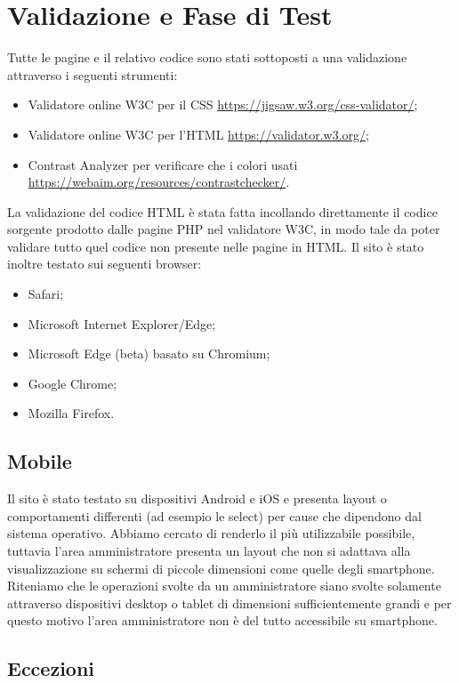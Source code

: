 \section{Validazione e Fase di Test}
Tutte le pagine e il relativo codice sono stati sottoposti a una validazione attraverso i seguenti strumenti:
    \begin{itemize}
        \item Validatore online W3C per il CSS \url{https://jigsaw.w3.org/css-validator/};
        \item Validatore online W3C per l'HTML \url{https://validator.w3.org/};
        \item Contrast Analyzer per verificare che i colori usati \url{https://webaim.org/resources/contrastchecker/}.
    \end{itemize}
    La validazione del codice HTML è stata fatta incollando direttamente il codice sorgente prodotto dalle pagine PHP nel validatore W3C, in modo tale da poter validare tutto quel codice non presente nelle pagine in HTML.
    Il sito è stato inoltre testato sui seguenti browser:
    \begin{itemize}
        \item Safari;
        \item Microsoft Internet Explorer/Edge;
        \item Microsoft Edge (beta) basato su Chromium;
        \item Google Chrome;
        \item Mozilla Firefox.
    \end{itemize}
        \subsection{Mobile}
        Il sito è stato testato su dispositivi Android e iOS e presenta layout o comportamenti differenti (ad esempio le select) per cause che dipendono dal sistema operativo. Abbiamo cercato di renderlo il più utilizzabile possibile, tuttavia l'area amministratore presenta un layout che non si adattava alla visualizzazione su schermi di piccole dimensioni come quelle degli smartphone. Riteniamo che le operazioni svolte da un amministratore siano svolte solamente attraverso dispositivi desktop o tablet di dimensioni sufficientemente grandi e per questo motivo l'area amministratore non è del tutto accessibile su smartphone.

	\subsection{Eccezioni}
\pagebreak